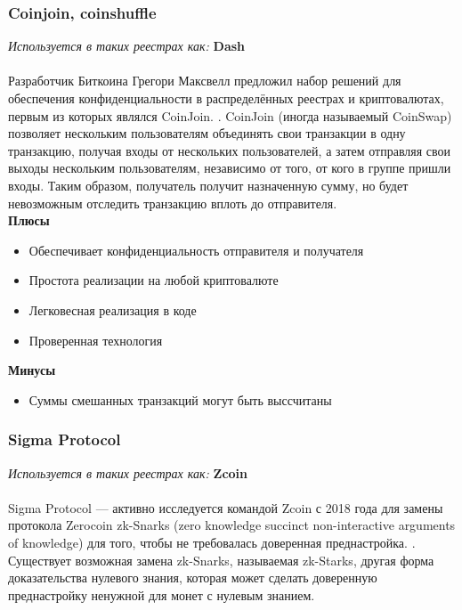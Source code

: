 \subsubsection{Coinjoin, coinshuffle}
\emph{Используется в таких реестрах как: } \textbf{ Dash } \\\\
Разработчик Биткоина Грегори Максвелл предложил набор решений для обеспечения
конфиденциальности в распределённых реестрах и криптовалютах, первым из которых
являлся CoinJoin. \cite{Maurera}. CoinJoin (иногда называемый CoinSwap)
позволяет нескольким пользователям объединять свои транзакции в одну
транзакцию, получая входы от нескольких пользователей, а затем отправляя свои
выходы нескольким пользователям, независимо от того, от кого в группе пришли
входы. Таким образом, получатель получит назначенную сумму, но будет
невозможным отследить транзакцию вплоть до отправителя.\\
\textbf{Плюсы}
\begin{itemize}
    \item Обеспечивает конфиденциальность отправителя и получателя
    \item Простота реализации на любой криптовалюте
    \item Легковесная реализация в коде
    \item Проверенная технология
\end{itemize}
\textbf{Минусы}
\begin{itemize}
    \item Суммы смешанных транзакций могут быть выссчитаны
\end{itemize}

\subsubsection{Sigma Protocol}
\emph{Используется в таких реестрах как: } \textbf{Zcoin} \\\\
Sigma Protocol --- активно исследуется командой Zcoin с 2018 года для замены
протокола Zerocoin zk-Snarks (zero knowledge succinct non-interactive arguments of
knowledge) для того, чтобы не требовалась доверенная
преднастройка. \cite{Groth2015}. Существует возможная замена zk-Snarks,
называемая zk-Starks, другая форма доказательства нулевого знания, которая
может сделать доверенную преднастройку ненужной для монет с нулевым знанием.

